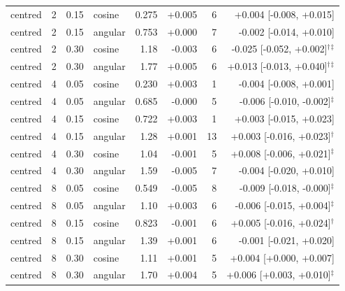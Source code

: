 \begin{tabular}{lrrlrrrr}
centred & 2 & 0.15 & cosine & 0.275 & +0.005 & 6 & +0.004 [-0.008, +0.015] \\
centred & 2 & 0.15 & angular & 0.753 & +0.000 & 7 & -0.002 [-0.014, +0.010] \\
centred & 2 & 0.30 & cosine & 1.18 & -0.003 & 6 & -0.025 [-0.052, +0.002]$^{\dagger}$$^{\ddagger}$ \\
centred & 2 & 0.30 & angular & 1.77 & +0.005 & 6 & +0.013 [-0.013, +0.040]$^{\dagger}$$^{\ddagger}$ \\
centred & 4 & 0.05 & cosine & 0.230 & +0.003 & 1 & -0.004 [-0.008, +0.001] \\
centred & 4 & 0.05 & angular & 0.685 & -0.000 & 5 & -0.006 [-0.010, -0.002]$^{\ddagger}$ \\
centred & 4 & 0.15 & cosine & 0.722 & +0.003 & 1 & +0.003 [-0.015, +0.023] \\
centred & 4 & 0.15 & angular & 1.28 & +0.001 & 13 & +0.003 [-0.016, +0.023]$^{\dagger}$ \\
centred & 4 & 0.30 & cosine & 1.04 & -0.001 & 5 & +0.008 [-0.006, +0.021]$^{\ddagger}$ \\
centred & 4 & 0.30 & angular & 1.59 & -0.005 & 7 & -0.004 [-0.020, +0.010] \\
centred & 8 & 0.05 & cosine & 0.549 & -0.005 & 8 & -0.009 [-0.018, -0.000]$^{\ddagger}$ \\
centred & 8 & 0.05 & angular & 1.10 & +0.003 & 6 & -0.006 [-0.015, +0.004]$^{\ddagger}$ \\
centred & 8 & 0.15 & cosine & 0.823 & -0.001 & 6 & +0.005 [-0.016, +0.024]$^{\dagger}$ \\
centred & 8 & 0.15 & angular & 1.39 & +0.001 & 6 & -0.001 [-0.021, +0.020] \\
centred & 8 & 0.30 & cosine & 1.11 & +0.001 & 5 & +0.004 [+0.000, +0.007] \\
centred & 8 & 0.30 & angular & 1.70 & +0.004 & 5 & +0.006 [+0.003, +0.010]$^{\ddagger}$ \\
\bottomrule
\end{tabular}
